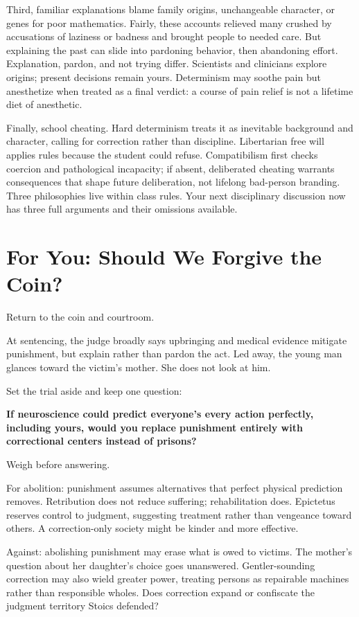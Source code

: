 Third, familiar explanations blame family origins, unchangeable character, or genes for poor mathematics. Fairly, these accounts relieved many crushed by accusations of laziness or badness and brought people to needed care. But explaining the past can slide into pardoning behavior, then abandoning effort. Explanation, pardon, and not trying differ. Scientists and clinicians explore origins; present decisions remain yours. Determinism may soothe pain but anesthetize when treated as a final verdict: a course of pain relief is not a lifetime diet of anesthetic.

Finally, school cheating. Hard determinism treats it as inevitable background and character, calling for correction rather than discipline. Libertarian free will applies rules because the student could refuse. Compatibilism first checks coercion and pathological incapacity; if absent, deliberated cheating warrants consequences that shape future deliberation, not lifelong bad-person branding. Three philosophies live within class rules. Your next disciplinary discussion now has three full arguments and their omissions available.

\section{For You: Should We Forgive the Coin?}
Return to the coin and courtroom.

At sentencing, the judge broadly says upbringing and medical evidence mitigate punishment, but explain rather than pardon the act. Led away, the young man glances toward the victim's mother. She does not look at him.

Set the trial aside and keep one question:

\textbf{If neuroscience could predict everyone's every action perfectly, including yours, would you replace punishment entirely with correctional centers instead of prisons?}

Weigh before answering.

For abolition: punishment assumes alternatives that perfect physical prediction removes. Retribution does not reduce suffering; rehabilitation does. Epictetus reserves control to judgment, suggesting treatment rather than vengeance toward others. A correction-only society might be kinder and more effective.

Against: abolishing punishment may erase what is owed to victims. The mother's question about her daughter's choice goes unanswered. Gentler-sounding correction may also wield greater power, treating persons as repairable machines rather than responsible wholes. Does correction expand or confiscate the judgment territory Stoics defended?

